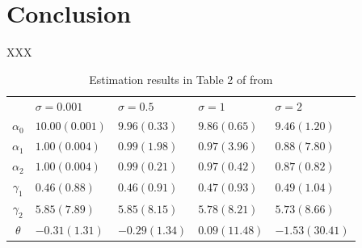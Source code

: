 \documentclass[11pt, a4paper]{article}
\begin{document}


    
\section{Conclusion}

XXX




\appendix



\begin{table}[!htbp]
    \centering
    \caption{Estimation results in Table 2 of from \cite{perloff2012collinearity}}
    \label{tb:linear_linear_sigma_Perloff_Shen} 
        \begin{tabular}{cllll}
            \hline\hline
            & $\sigma=0.001$ & $\sigma=0.5$ & $\sigma=1$ & $\sigma=2$ \\
            $\alpha_0$ & $10.00(0.001)$ & $9.96(0.33)$ & $9.86(0.65)$ & $9.46(1.20)$ \\
            $\alpha_1$ & $1.00(0.004)$ & $0.99(1.98)$ & $0.97(3.96)$ & $0.88(7.80)$ \\
            $\alpha_2$ & $1.00(0.004)$ & $0.99(0.21)$ & $0.97(0.42)$ & $0.87(0.82)$ \\
            $\gamma_1$ & $0.46(0.88)$ & $0.46(0.91)$ & $0.47(0.93)$ & $0.49(1.04)$ \\
            $\gamma_2$ & $5.85(7.89)$ & $5.85(8.15)$ & $5.78(8.21)$ & $5.73(8.66)$ \\
            $\theta$ & $-0.31(1.31)$ & $-0.29(1.34)$ & $0.09(11.48)$ & $-1.53(30.41)$ \\
            \hline
        \end{tabular}
\end{table}
\end{document}
